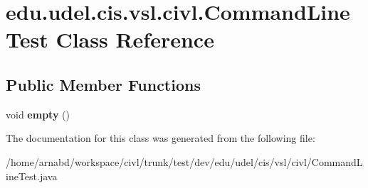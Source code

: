 \hypertarget{classedu_1_1udel_1_1cis_1_1vsl_1_1civl_1_1CommandLineTest}{}\section{edu.\+udel.\+cis.\+vsl.\+civl.\+Command\+Line\+Test Class Reference}
\label{classedu_1_1udel_1_1cis_1_1vsl_1_1civl_1_1CommandLineTest}
\subsection*{Public Member Functions}
\begin{DoxyCompactItemize}
\item 
\hypertarget{classedu_1_1udel_1_1cis_1_1vsl_1_1civl_1_1CommandLineTest_a3b206cea0791d11f53f3ea51cb579b91}{}void {\bfseries empty} ()\label{classedu_1_1udel_1_1cis_1_1vsl_1_1civl_1_1CommandLineTest_a3b206cea0791d11f53f3ea51cb579b91}

\end{DoxyCompactItemize}


The documentation for this class was generated from the following file\+:\begin{DoxyCompactItemize}
\item 
/home/arnabd/workspace/civl/trunk/test/dev/edu/udel/cis/vsl/civl/Command\+Line\+Test.\+java\end{DoxyCompactItemize}
